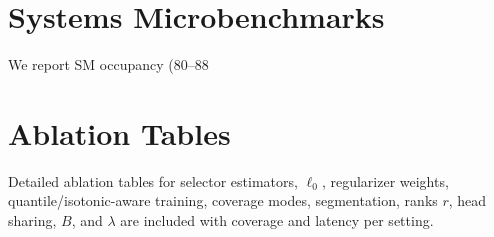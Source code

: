 \documentclass[11pt]{article}
\begin{document}
\section{Systems Microbenchmarks}
We report SM occupancy (80–88%

\section{Ablation Tables}
Detailed ablation tables for selector estimators, $\ell_0$, regularizer weights, quantile/isotonic-aware training, coverage modes, segmentation, ranks $r$, head sharing, $B$, and $\lambda$ are included with coverage and latency per setting.
\end{document}
